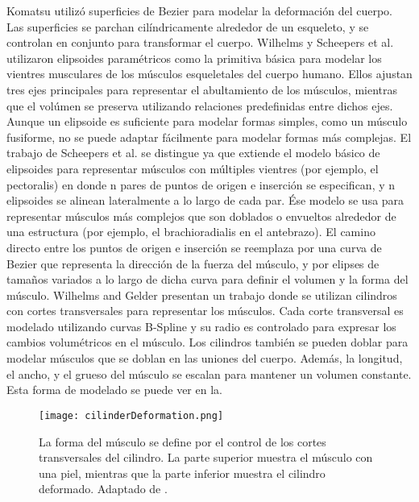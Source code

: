 Komatsu \cite{komatsu1988human} utilizó superficies de Bezier para modelar la deformación del cuerpo. Las superficies se parchan cilíndricamente alrededor de un esqueleto, y se controlan en conjunto para transformar el cuerpo. Wilhelms \cite{wilhelms1997animals} y Scheepers et al. \cite{Scheepers:1997} utilizaron elipsoides paramétricos como la primitiva básica para modelar los vientres musculares de los músculos esqueletales del cuerpo humano. Ellos ajustan tres ejes principales para representar el abultamiento de los músculos, mientras que el volúmen se preserva utilizando relaciones predefinidas entre dichos ejes. Aunque un elipsoide es suficiente para modelar formas simples, como un músculo fusiforme, no se puede adaptar fácilmente para modelar formas más complejas. El trabajo de Scheepers et al. se distingue ya que extiende el modelo básico de elipsoides para representar músculos con múltiples vientres (por ejemplo, el pectoralis) en donde n pares de puntos de origen e inserción se especifican, y n elipsoides se alinean lateralmente a lo largo de cada par. Ése modelo se usa para representar músculos más complejos que son doblados o envueltos alrededor de una estructura (por ejemplo, el brachioradialis en el antebrazo). El camino directo entre los puntos de origen e inserción se reemplaza por una curva de Bezier que representa la dirección de la fuerza del músculo, y por elipses de tamaños variados a lo largo de dicha curva para definir el volumen y la forma del músculo. Wilhelms and Gelder \cite{wilhelms1997anatomically} presentan un trabajo donde se utilizan cilindros con cortes transversales para representar los músculos. Cada corte transversal es modelado utilizando curvas B-Spline y su radio es controlado para expresar los cambios volumétricos en el músculo. Los cilindros también se pueden doblar para modelar músculos que se doblan en las uniones del cuerpo. Además, la longitud, el ancho, y el grueso del músculo se escalan para mantener un volumen constante. Esta forma de modelado se puede ver en la.

\begin{figure}
	\centering
		\texttt{[image: cilinderDeformation.png]}
		\caption[Ejemplo de la deformación de un cilindro con cortes transversales.]{La forma del músculo se define por el control de los cortes transversales del cilindro. La parte superior muestra el músculo con una piel, mientras que la parte inferior muestra el cilindro deformado. Adaptado de \citep{wilhelms1997anatomically}.}
		\label{fig:cilinderDeformation}
\end{figure}

